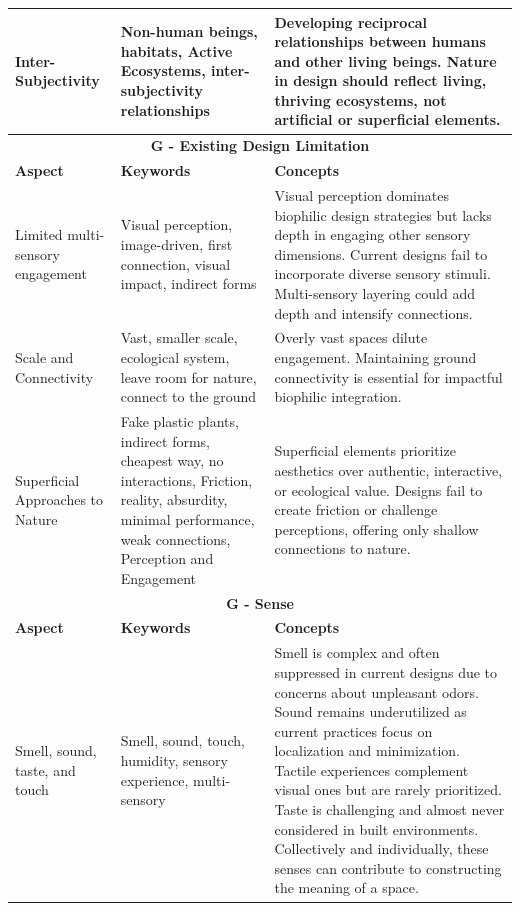 \begin{longtable}{|p{3cm}|p{3.5cm}|p{7.5cm}|}
Inter-Subjectivity & Non-human beings, habitats, Active Ecosystems, inter-subjectivity relationships &  Developing reciprocal relationships between humans and other living beings. Nature in design should reflect living, thriving ecosystems, not artificial or superficial elements.  \\ \hline

\multicolumn{3}{|c|}{\cellcolor[HTML]{C8E6C9}\textbf{G - Existing Design Limitation}} \\ \hline
\textbf{Aspect} & \textbf{Keywords} & \textbf{Concepts} \\
\hline
Limited multi-sensory engagement & Visual perception, image-driven, first connection, visual impact, indirect forms & Visual perception dominates biophilic design strategies but lacks depth in engaging other sensory dimensions. Current designs fail to incorporate diverse sensory stimuli. Multi-sensory layering could add depth and intensify connections.\\ \hline


Scale and Connectivity & Vast, smaller scale, ecological system, leave room for nature, connect to the ground & Overly vast spaces dilute engagement. Maintaining ground connectivity is essential for impactful biophilic integration. \\ \hline

Superficial Approaches to Nature & Fake plastic plants, indirect forms, cheapest way, no interactions, Friction, reality, absurdity, minimal performance, weak connections, Perception and Engagement  & Superficial elements prioritize aesthetics over authentic, interactive, or ecological value. Designs fail to create friction or challenge perceptions, offering only shallow connections to nature.\\ \hline


\multicolumn{3}{|c|}{\cellcolor[HTML]{F1F8E9}\textbf{G - Sense}} \\ \hline
\textbf{Aspect} & \textbf{Keywords} & \textbf{Concepts} \\
\hline
Smell, sound, taste, and touch & Smell, sound, touch, humidity, sensory experience, multi-sensory & Smell is complex and often suppressed in current designs due to concerns about unpleasant odors. Sound remains underutilized as current practices focus on localization and minimization. Tactile experiences complement visual ones but are rarely prioritized. Taste is challenging and almost never considered in built environments. Collectively and individually, these senses can contribute to constructing the meaning of a space. \\ \hline


\end{longtable}
